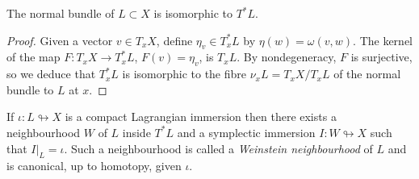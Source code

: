 \documentclass{article}
\begin{document}
\begin{Lemma}
  The normal bundle of $L\subset X$ is isomorphic to $T^*L$.
\end{Lemma}
\begin{proof}
  Given a vector $v\in T_xX$, define $\eta_v\in T_x^*L$ by $\eta(w)=\omega(v,w)$. The kernel of the map $F\colon T_xX\to T_x^*L$, $F(v)=\eta_v$, is $T_xL$. By nondegeneracy, $F$ is surjective, so we deduce that $T_x^*L$ is isomorphic to the fibre $\nu_xL=T_xX/T_xL$ of the normal bundle to $L$ at $x$.
\end{proof}

\begin{Theorem}[weinsteinnbhd]
  If $\iota\colon L\looparrowright X$ is a compact Lagrangian immersion then there exists a neighbourhood $W$ of $L$ inside $T^*L$ and a symplectic immersion $I\colon W\looparrowright X$ such that $I|_L=\iota$. Such a neighbourhood is called a {\em Weinstein neighbourhood} of $L$ and is canonical, up to homotopy, given $\iota$.
\end{Theorem}
\end{document}
